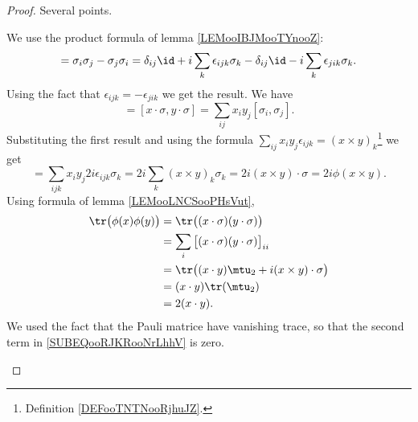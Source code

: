 \begin{proof}
	Several points.

	\begin{subproof}
		We use the product formula of lemma \ref{LEMooIBJMooTYnooZ}:
		\begin{equation}
			[\sigma_i,\sigma_j]=\sigma_i\sigma_j-\sigma_j\sigma_i=\delta_{ij}\id+i\sum_k\epsilon_{ijk}\sigma_k-\delta_{ij}\id-i\sum_k\epsilon_{jik}\sigma_k.
		\end{equation}
		Using the fact that \( \epsilon_{ijk}=-\epsilon_{jik}\) we get the result.
		We have
		\begin{equation}
			[\phi(x),\phi(y)]=[x\cdot \sigma,y\cdot \sigma]=\sum_{ij}x_iy_j[\sigma_i,\sigma_j].
		\end{equation}
		Substituting the first result and using the formula \( \sum_{ij}x_iy_j\epsilon_{ijk}=(x\times y)_k\)\footnote{Definition \ref{DEFooTNTNooRjhuJZ}.} we get
		\begin{equation}
			[\phi(x),\phi(y)] = \sum_{ijk}x_iy_j2i\epsilon_{ijk}\sigma_k=2i\sum_k(x\times y)_k\sigma_k=2i(x\times y)\cdot \sigma=2i\phi(x\times y).
		\end{equation}
		Using formula of lemma \ref{LEMooLNCSooPHsVut},
		\begin{subequations}
			\begin{align}
				\tr\big( \phi(x)\phi(y) \big) & =\tr\big( (x\cdot \sigma)(y\cdot \sigma) \big)                                             \\
				                              & =\sum_i\big[ (x\cdot \sigma)(y\cdot \sigma) \big]_{ii}                                     \\
				                              & =\tr\big( (x\cdot y)\mtu_2+i(x\times y)\cdot \sigma \big)      \label{SUBEQooRJKRooNrLhhV} \\
				                              & =(x\cdot y)\tr(\mtu_2)                                                                     \\
				                              & =2(x\cdot y).
			\end{align}
		\end{subequations}
		We used the fact that the Pauli matrice have vanishing trace, so that the second term in \eqref{SUBEQooRJKRooNrLhhV} is zero.
	\end{subproof}
\end{proof}

